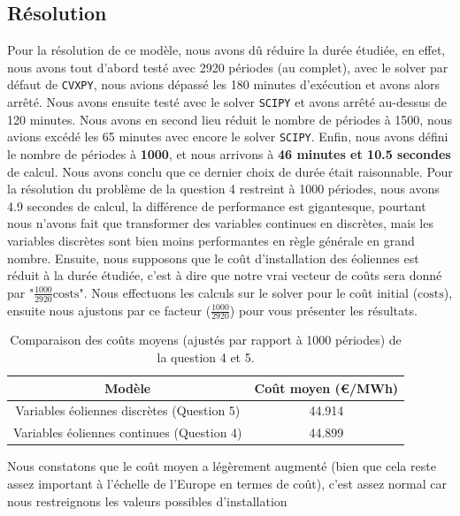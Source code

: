 \documentclass{article}
\begin{document}
\subsection*{Résolution}
Pour la résolution de ce modèle, nous avons dû réduire la durée étudiée, en effet, nous avons tout d'abord
testé avec 2920 périodes (au complet), avec le solver par défaut de \verb|CVXPY|, nous avions dépassé les 180 minutes
d'exécution et avons alors arrêté. Nous avons ensuite testé avec le solver \verb|SCIPY| et avons arrêté au-dessus de 120
minutes. Nous avons en second lieu réduit le nombre de périodes à 1500, nous avions excédé les 65
minutes avec encore le solver \verb|SCIPY|. Enfin, nous avons défini le nombre de périodes à \textbf{1000}, et nous arrivons
à \textbf{46 minutes et 10.5 secondes} de calcul. Nous avons conclu que ce dernier choix de durée était raisonnable. Pour la résolution du problème 
de la question 4 restreint à 1000 périodes, nous avons 4.9 secondes de calcul, la différence de performance est gigantesque, pourtant nous n'avons
fait que transformer des variables continues en discrètes, mais les variables discrètes sont bien moins performantes en règle générale en grand nombre.
Ensuite, nous supposons que le coût d'installation des éoliennes
est réduit à la durée étudiée, c'est à dire que notre vrai vecteur de coûts sera donné par "$\frac{1000}{2920} \mathrm{costs}$".
Nous effectuons les calculs sur le solver pour le coût initial ($\mathrm{costs}$), ensuite nous ajustons 
par ce facteur ($\frac{1000}{2920}$) pour vous présenter les résultats.
\begin{table}[H]
    \centering
    \renewcommand{\arraystretch}{1.5}%
    \begin{tabular}{|c | c |} 
        \hline
        Modèle & Coût moyen (€/MWh) \\
        \hline
        Variables éoliennes discrètes (Question 5) & 44.914 \\
        \hline
        Variables éoliennes continues (Question 4) & 44.899 \\
        \hline
    \end{tabular}
    \caption{Comparaison des coûts moyens (ajustés par rapport à 1000 périodes) de la question 4 et 5.}
    \label{table:comparaison_resultat_Q5_Q4_1000}
\end{table} 
\noindent Nous constatons que le coût moyen a légèrement augmenté (bien que cela reste assez important à l'échelle
de l'Europe en termes de coût), c'est assez normal car nous restreignons les valeurs possibles d'installation 
\end{document}
